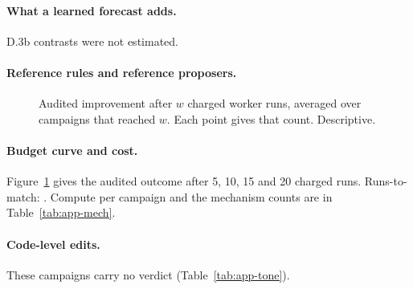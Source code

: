 \paragraph{What a learned forecast adds.}
\ifLearnedNotRun D.3b contrasts were not estimated.
\else{}\fi

\paragraph{Reference rules and reference proposers.}

\begin{figure}[t]
\centering
{}
\caption{Audited improvement after $w$ charged worker runs, averaged over campaigns that reached $w$. Each point gives that count. Descriptive.}
\label{fig:budget}
\end{figure}

\paragraph{Budget curve and cost.}
Figure~\ref{fig:budget} gives the audited outcome after 5, 10, 15 and 20 charged runs. Runs-to-match: \LoopRunsToMatch. Compute per campaign and the mechanism counts are in Table~\ref{tab:app-mech}. 

\paragraph{Code-level edits.}
\LoopTOneSummary{} These campaigns carry no verdict (Table~\ref{tab:app-tone}).

